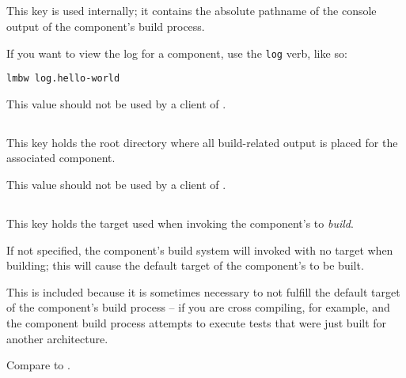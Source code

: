 \subsection{}\label{variables:build-log}

This key is used internally; it contains the absolute pathname of the
console output of the component's build process.

If you want to view the log for a component, use the \texttt{log}
verb, like so:

\begin{verbatim}
lmbw log.hello-world
\end{verbatim}

This value should not be used by a client of \lmsbw.


\subsection{}\label{variables:build-root-directory}

This key holds the root directory where all build-related output is
placed for the associated component.

This value should not be used by a client of \lmsbw.


\subsection{}\label{variables:build-target}

This key holds the target used when invoking the component's \makefile
to \emph{build}.

If not specified, the component's build system will invoked with no
target when building; this will cause the default target of the
component's \makefile to be built.

This is included because it is sometimes necessary to not fulfill the
default target of the component's build process -- if you are cross
compiling, for example, and the component build process attempts to
execute tests that were just built for another architecture.

Compare to .



